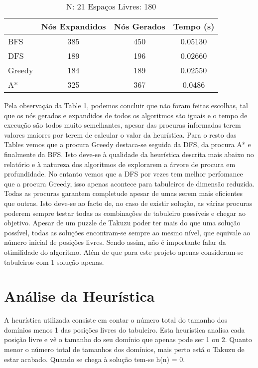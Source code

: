 \documentclass[12pt,a4paper]{article}
\begin{document}
  \begin{table}[H]
    \caption{N: 21 Espaços Livres: 180}
    \label{tab:my-table3}
    \centering
    \begin{tabular}{lccc}
      & Nós Expandidos & Nós Gerados & Tempo (s) \\
      \hline
      BFS    & 385 & 450 & 0.05130 \\
      DFS    & 189 & 196 & 0.02660 \\
      Greedy & 184 & 189 & 0.02550 \\
      A*     & 325 & 367 & 0.0486 \\
    \hline
    \end{tabular}
  \end{table}

  Pela observação da Table 1, podemos concluir que não foram feitas escolhas, tal que os nós gerados e expandidos de todos os algoritmos são iguais e o tempo de execução são todos muito semelhantes, apesar das procuras informadas terem valores maiores por terem de calcular o valor da heurística.
  Para o resto das Tables vemos que a procura Greedy destaca-se seguida da DFS, da procura A* e finalmente da BFS.
  Isto deve-se à qualidade da heurística descrita mais abaixo no relatório e à natureza dos algoritmos de explorarem a árvore de procura em profundidade.
  No entanto vemos que a DFS por vezes tem melhor perfomance que a procura Greedy, isso apenas acontece para tabuleiros de dimensão reduzida. 
  Todas as procuras garantem completude apesar de umas serem mais eficientes que outras. Isto deve-se ao facto de, no caso de existir solução, as várias procuras poderem sempre testar todas as combinações de tabuleiro possíveis e chegar ao objetivo.
  Apesar de um puzzle de Takuzu poder ter mais do que uma solução possível, todas as soluções encontram-se sempre ao mesmo nível, que equivale ao número inicial de posições livres. Sendo assim, não é importante falar da otimilidade do algoritmo.
  Além de que para este projeto apenas consideram-se tabuleiros com 1 solução apenas.
  
  \section{Análise da Heurística}

  A heurística utilizada consiste em contar o número total do tamanho dos domínios menos 1 das posições livres do tabuleiro.
  Esta heurística analisa cada posição livre e vê o tamanho do seu domínio que apenas pode ser 1 ou 2.
  Quanto menor o número total de tamanhos dos domínios, mais perto está o Takuzu de estar acabado.
  Quando se chega à solução tem-se h(n) = 0.
  
\end{document}
